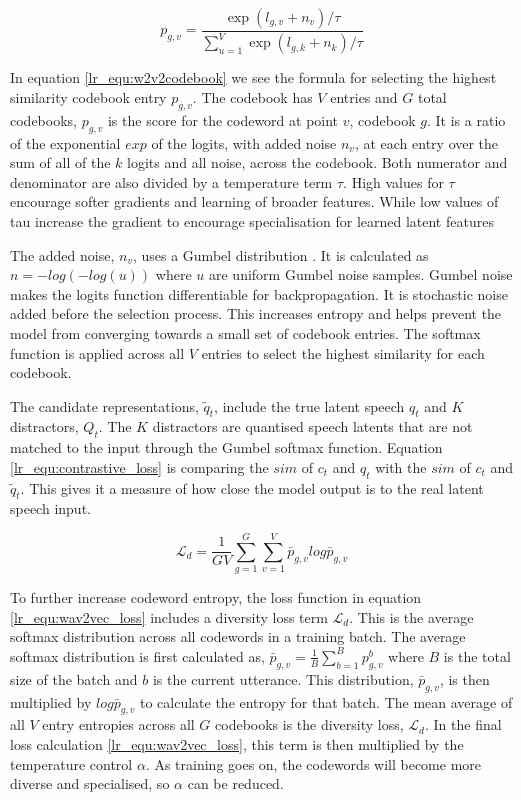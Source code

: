 \begin{equation}\label{lr_equ:w2v2codebook}
    p_{g,v} = \frac{\exp(l_{g,v} + n_v)/\tau}{\sum_{u=1}^{V} \exp(l_{g,k} + n_k)/\tau}
\end{equation}

In equation \ref{lr_equ:w2v2codebook} we see the formula for selecting the highest similarity codebook entry $p_{g,v}$. The codebook has $V$ entries and $G$ total codebooks, $p_{g,v}$ is the score for the codeword at point $v$, codebook $g$. It is a ratio of the exponential $exp$ of the logits, with added noise $n_v$, at each entry over the sum of all of the $k$ logits and all noise, across the codebook. Both numerator and denominator are also divided by a temperature term $\tau$.  High values for $\tau$ encourage softer gradients and learning of broader features. While low values of tau increase the gradient to encourage specialisation for learned latent features

The added noise, $n_v$, uses a Gumbel distribution \cite{jang2017categorical}. It is calculated as $n=-log(-log(u))$ where $u$ are uniform Gumbel noise samples. Gumbel noise makes the logits function differentiable for backpropagation. It is stochastic noise added before the selection process. This increases entropy and helps prevent the model from converging towards a small set of codebook entries. The softmax function \cite{jang2017categorical} is applied across all $V$ entries to select the highest similarity for each codebook. 

The candidate representations, $\tilde q_t$, include the true latent speech $q_t$ and $K$ distractors, $Q_t$. The $K$ distractors are quantised speech latents that are not matched to the input through the Gumbel softmax function. Equation \ref{lr_equ:contrastive_loss} is comparing the $sim$ of $c_t$ and $q_t$ with the $sim$ of $c_t$ and $\tilde q_t$. This gives it a measure of how close the model output is to the real latent speech input.

\begin{equation}\label{lr_equ:diversity_loss}
    \mathcal{L}_d=\frac{1}{GV}\sum_{g=1}^G\sum_{v=1}^V\bar{p}_{g,v}log\bar{p}_{g,v}
\end{equation}

To further increase codeword entropy, the loss function in equation \ref{lr_equ:wav2vec_loss} includes a diversity loss term $\mathcal{L}_d$. This is the average softmax distribution across all codewords in a training batch. The average softmax distribution is first calculated as, $\bar{p}_{g,v}=\frac{1}{B}\sum_{b=1}^Bp_{g,v}^b$ where $B$ is the total size of the batch and $b$ is the current utterance. This distribution, $\bar{p}_{g,v}$, is then multiplied by $log\bar{p}_{g,v}$ to calculate the entropy for that batch. The mean average of all $V$ entry entropies across all $G$ codebooks is the diversity loss, $\mathcal{L}_d$. In the final loss calculation \ref{lr_equ:wav2vec_loss}, this term is then multiplied by the temperature control $\alpha$. As training goes on, the codewords will become more diverse and specialised, so $\alpha$ can be reduced.


